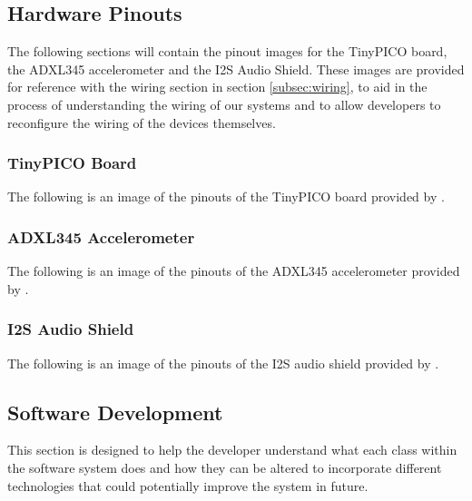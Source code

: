 		\newpage
		\subsection{Hardware Pinouts}
		\label{subsec:hardware_pinouts}

			The following sections will contain the pinout images for the TinyPICO board, the ADXL345 accelerometer and the I2S Audio Shield. These images are provided for reference with the wiring section in section \ref{subsec:wiring}, to aid in the process of understanding the wiring of our systems and to allow developers to reconfigure the wiring of the devices themselves.

			\subsubsection{TinyPICO Board}

				The following is an image of the pinouts of the TinyPICO board provided by \cite{tinypico}.

				

			\newpage
			\subsubsection{ADXL345 Accelerometer}

				The following is an image of the pinouts of the ADXL345 accelerometer provided by \cite{components101}.

				

			\newpage
			\subsubsection{I2S Audio Shield}

				The following is an image of the pinouts of the I2S audio shield provided by \cite{unexpected_maker}.

				

		\newpage
		\subsection{Software Development}

			This section is designed to help the developer understand what each class within the software system does and how they can be altered to incorporate different technologies that could potentially improve the system in future.

			
